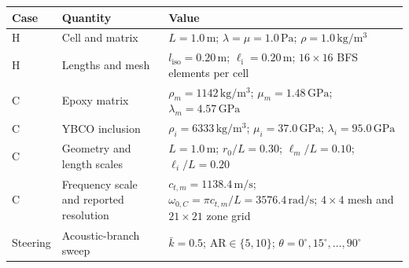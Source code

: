 \begin{tabularx}{\textwidth}{@{}l p{3.0cm} Y@{}}
\toprule
Case & Quantity & Value \\
\midrule
H & Cell and matrix & $L=1.0\,\mathrm{m}$; $\lambda=\mu=1.0\,\mathrm{Pa}$; $\rho=1.0\,\mathrm{kg/m^3}$ \\
H & Lengths and mesh & $l_{\mathrm{iso}}=0.20\,\mathrm{m}$; $\ell_{\mathrm{i}}=0.20\,\mathrm{m}$; $16\times16$ BFS elements per cell \\
C & Epoxy matrix & $\rho_m=1142\,\mathrm{kg/m^3}$; $\mu_m=1.48\,\mathrm{GPa}$; $\lambda_m=4.57\,\mathrm{GPa}$ \\
C & YBCO inclusion & $\rho_i=6333\,\mathrm{kg/m^3}$; $\mu_i=37.0\,\mathrm{GPa}$; $\lambda_i=95.0\,\mathrm{GPa}$ \\
C & Geometry and length scales & $L=1.0\,\mathrm{m}$; $r_0/L=0.30$; $\ell_m/L=0.10$; $\ell_i/L=0.20$ \\
C & Frequency scale and reported resolution & $c_{t,m}=1138.4\,\mathrm{m/s}$; $\omega_{0,C}=\pi c_{t,m}/L=3576.4\,\mathrm{rad/s}$; $4\times4$ mesh and $21\times21$ zone grid \\
Steering & Acoustic-branch sweep & $\bar{k}=0.5$; $\mathrm{AR}\in\{5,10\}$; $\theta=0^\circ,15^\circ,\ldots,90^\circ$ \\
\bottomrule
\end{tabularx}
